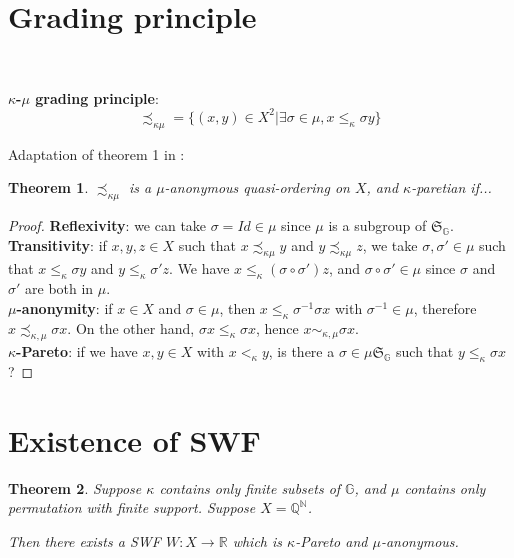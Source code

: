 \documentclass{article}
\newcommand{\G}{\mathbb{G}}
\newtheorem{theorem}{Theorem}
\begin{document}
\section{Grading principle}
\ \par
\textbf{$\kappa$-$\mu$ grading principle}:
\[\precsim_{\kappa\mu} = \{(x,y)\in X^2 |
\exists\sigma\in\mu, x \leq_\kappa \sigma y\}\]

Adaptation of theorem 1 in \cite{svensson80}:
\begin{theorem}
    $\precsim_{\kappa\mu}$ is a $\mu$-anonymous quasi-ordering on $X$, and
    $\kappa$-paretian if...
\end{theorem}
\begin{proof}
    \textbf{Reflexivity}: we can take $\sigma = Id\in\mu$ since $\mu$ is a
    subgroup of $\mathfrak{S}_\G$.\\
    \textbf{Transitivity}: if $x,y,z\in X$ such that $x \precsim_{\kappa\mu} y$ and
    $y \precsim_{\kappa\mu} z$,
    we take $\sigma,\sigma'\in \mu$ such that $x\leq_\kappa \sigma y$ and
    $y\leq_\kappa \sigma' z$. We have $x\leq_\kappa (\sigma\circ\sigma')z$,
    and $\sigma\circ\sigma'\in\mu$ since $\sigma$ and $\sigma'$ are both in $\mu$.\\
    \textbf{$\mu$-anonymity}: if $x\in X$ and $\sigma\in\mu$, then
    $x\leq_\kappa\sigma^{-1}\sigma x$ with $\sigma^{-1}\in\mu$,
    therefore $x \precsim_{\kappa,\mu} \sigma x$. On the other hand,
    $\sigma x \leq_{\kappa}\sigma x$, hence $x \sim_{\kappa, \mu}\sigma x$.\\
    \textbf{$\kappa$-Pareto}: if we have $x,y\in X$ with $x<_\kappa y$, is there a
    $\sigma\in \mu\mathfrak{S}_\G$ such that $y\leq_\kappa \sigma x$?
\end{proof}

\section{Existence of SWF}

\begin{theorem}
  Suppose $\kappa$ contains only finite subsets of $\G$, and $\mu$ contains only permutation
  with finite support. Suppose $X=\mathbb Q^{\mathbb N}$.

  Then there exists a SWF $W:X\to\mathbb R$ which is $\kappa$-Pareto and $\mu$-anonymous.
\end{theorem}
\end{document}

